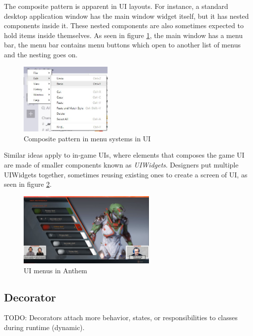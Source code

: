 \begin{multicols}{2}
The composite pattern is apparent in UI layouts. For instance, a standard desktop application window has the main window widget itself, but it has nested components inside it. These nested components are also sometimes expected to hold items inside themselves. As seen in figure \ref{fig:submenus}, the main window has a menu bar, the menu bar contains menu buttons which open to another list of menus and the nesting goes on.

\begin{figure}[H]
	\centering
	\includegraphics[width=0.4\textwidth]{assets/submenus}
	\caption{Composite pattern in menu systems in UI}
	\label{fig:submenus}
\end{figure}

Similar ideas apply to in-game UIs, where elements that composes the game UI are made of smaller components known as \textit{UIWidgets}. Designers put multiple UIWidgets together, sometimes reusing existing ones to create a screen of UI, as seen in figure \ref{fig:anthem-forge}.

\begin{figure}[H]
	\centering
	\includegraphics[width=0.6\textwidth]{assets/anthem-forge}
	\caption{UI menus in Anthem\cite{anthem-customization}}
	\label{fig:anthem-forge}
\end{figure}


\subsection{Decorator}
TODO: Decorators attach more behavior, states, or responsibilities to classes during runtime (dynamic).


\end{multicols}
